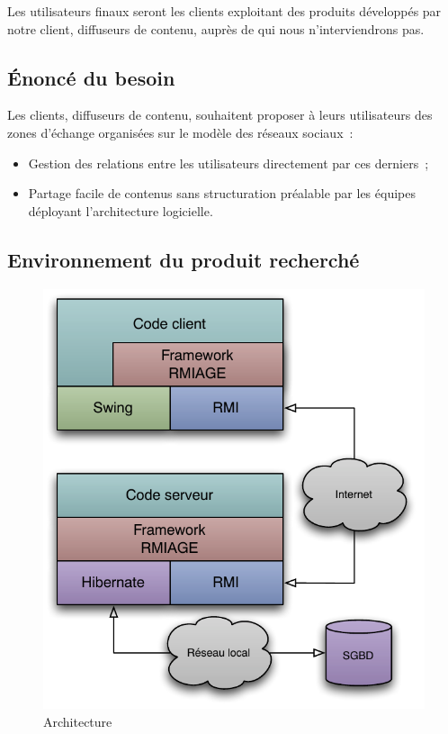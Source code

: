 Les utilisateurs finaux seront les clients exploitant des produits développés par notre client, diffuseurs de contenu, auprès de qui nous n'interviendrons pas.

\subsection{Énoncé du besoin}

Les clients, diffuseurs de contenu, souhaitent proposer à leurs utilisateurs des zones d'échange organisées sur le modèle des réseaux sociaux~:

\begin{itemize}
	\item Gestion des relations entre les utilisateurs directement par ces derniers~;
	\item Partage facile de contenus sans structuration préalable par les équipes déployant l'architecture logicielle.
\end{itemize}

\subsection{Environnement du produit recherché}

\begin{figure}[thbp]
	\centering
		\includegraphics[scale=1]{../diagrammes/architecture.pdf}
	\caption{Architecture}
	\label{fig:archi}
\end{figure}

